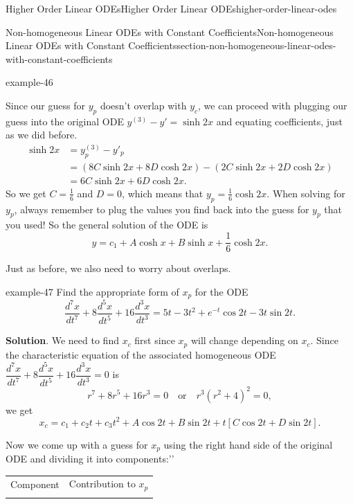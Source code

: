 \documentclass[oneside,10pt,]{book}
\numberwithin{equation}{section}
\newcommand{\hrulethick} {\noalign{\hrule height 0.11em}}
\newcommand{\dv}[3][]{\dfrac{d^{#1} #2}{d #3^{#1}}}
\newcommand{\brackets}[1]{\left[ #1 \right]}
\newcommand{\parens}[1]{\left( #1 \right)}
\newcommand{\amp}{&}
\begin{document}
\begin{chapterptx}{Higher Order Linear ODEs}{}{Higher Order Linear ODEs}{}{}{higher-order-linear-odes}
\begin{sectionptx}{Non-homogeneous Linear ODEs with Constant Coefficients}{}{Non-homogeneous Linear ODEs with Constant Coefficients}{}{}{section-non-homogeneous-linear-odes-with-constant-coefficients}
\begin{example}{}{example-46}
\par
\hypertarget{p-286}{}%
Since our guess for \(y_{p}\) doesn't overlap with \(y_{c}\), we can proceed with plugging our guess into the original ODE \(y^{(3)}-y'=\sinh 2x\) and equating coefficients, just as we did before.%
\begin{align*}
\sinh 2x \amp= y^{(3)}_{p}-y'_{p}\\
\amp= \parens{8C\sinh2x+8D\cosh2x}-\parens{2C\sinh2x+2D\cosh2x}\\
\amp= 6C\sinh2x+6D\cosh2x.
\end{align*}
So we get \(C = \frac{1}{6}\) and \(D=0\), which means that \(y_{p} = \frac{1}{6}\cosh2x\). When solving for \(y_{p}\), always remember to plug the values you find back into the guess for \(y_{p}\) that you used! So the general solution of the ODE is%
\begin{equation*}
y = c_{1}+A\cosh x+B\sinh x+\frac{1}{6}\cosh2x.
\end{equation*}
%
\end{example}
\hypertarget{p-287}{}%
Just as before, we also need to worry about overlaps.%
\begin{example}{}{example-47}%
\hypertarget{p-288}{}%
Find the appropriate form of \(x_{p}\) for the ODE%
\begin{equation*}
\dv[7]{x}{t}+8\dv[5]{x}{t}+16\dv[3]{x}{t} = 5t-3t^{2}+e^{-t}\cos2t-3t\sin2t.
\end{equation*}
%
\par\smallskip%
\noindent\textbf{Solution}.\hypertarget{solution-44}{}\quad%
\hypertarget{p-289}{}%
We need to find \(x_{c}\) first since \(x_{p}\) will change depending on \(x_{c}\). Since the characteristic equation of the associated homogeneous ODE \(\dv[7]{x}{t}+8\dv[5]{x}{t}+16\dv[3]{x}{t}=0\) is%
\begin{equation*}
r^{7}+8r^{5}+16r^{3} = 0\quad\text{or}\quad r^{3}(r^{2}+4)^{2}=0,
\end{equation*}
we get%
\begin{equation*}
x_{c} = c_{1}+c_{2}t+c_{3}t^{2}+A\cos2t+B\sin2t + t\brackets{C\cos2t+D\sin2t}.
\end{equation*}
%
\par
\hypertarget{p-290}{}%
Now we come up with a guess for \(x_{p}\) using the right hand side of the original ODE and dividing it into \textasciigrave{}\textasciigrave{}components:'{}'{}%
\begin{table}
\centering
\begin{tabular}{ll}\hrulethick
Component&Contribution to \(x_{p}\)\tabularnewline\hrulethick

\end{tabular}
\end{table}
\end{example}
\end{sectionptx}
\end{chapterptx}
\end{document}
